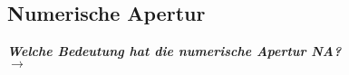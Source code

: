\subsection{\label{subsec:FZV9}Numerische Apertur}
\textbf{\textit{Welche Bedeutung hat die numerische Apertur NA?}} \\
$\rightarrow$